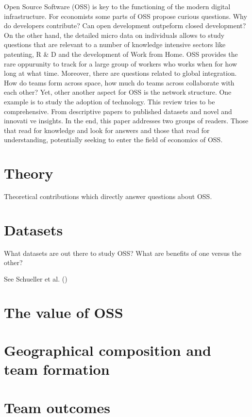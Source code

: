 \documentclass[
  12pt,
]{article}
\begin{document}
Open Source Software (OSS) is key to the functioning of the modern
digital infrastructure. For economists some parts of OSS propose curious
questions. Why do developers contribute? Can open development outpeform
closed development? On the other hand, the detailed micro data on
individuals allows to study questions that are relevant to a number of
knowledge intensive sectors like patenting, R \& D and the development
of Work from Home. OSS provides the rare oppurunity to track for a large
group of workers who works when for how long at what time. Moreover,
there are questions related to global integration. How do teams form
across space, how much do teams across collaborate with each other? Yet,
other another aspect for OSS is the network structure. One example is to
study the adoption of technology. This review tries to be comprehensive.
From descriptive papers to published datasets and novel and innovati ve
insights. In the end, this paper addresses two groups of readers. Those
that read for knowledge and look for answers and those that read for
understanding, potentially seeking to enter the field of economics of
OSS.

\section{Theory}\label{sec-theory}

Theoretical contributions which directly answer questions about OSS.

\section{Datasets}\label{sec-datasets}

What datasets are out there to study OSS? What are benefits of one
versus the other?

See Schueller et al. ()

\section{The value of OSS}\label{sec-value}

\section{Geographical composition and team formation}\label{sec-teams}

\section{Team outcomes}\label{sec-outcomes}
\end{document}
